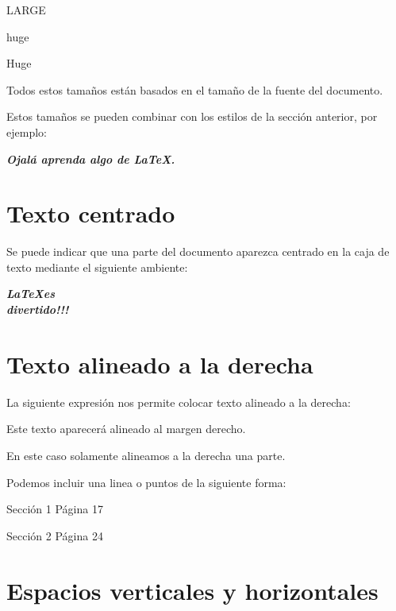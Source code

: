 \documentclass[letterpaper,12pt]{book}
\begin{document}
{\LARGE LARGE}

{\huge huge}

{\Huge Huge}

Todos estos tamaños están basados en el tamaño de la fuente del documento.

Estos tamaños se pueden combinar con los estilos de la sección anterior, por ejemplo:

\begin{Large}
\textbf{\textit{Ojalá aprenda algo de \LaTeX.}}
\end{Large}

\chapter{Texto centrado}

Se puede indicar que una parte del documento aparezca centrado en la caja de texto mediante el siguiente ambiente:

\begin{center}
\LARGE{\textbf{\textit{\LaTeX es \\ divertido!!!}}}
\end{center}

\chapter{Texto alineado a la derecha}

La siguiente expresión nos permite colocar texto alineado a la derecha:

\hfill Este texto aparecerá alineado al margen derecho.

En este caso solamente alineamos a la derecha \hfill una parte.

Podemos incluir una linea o puntos de la siguiente forma:

Sección 1 \hrulefill Página 17

Sección 2 \dotfill Página 24

\chapter{Espacios verticales y horizontales}
\end{document}
